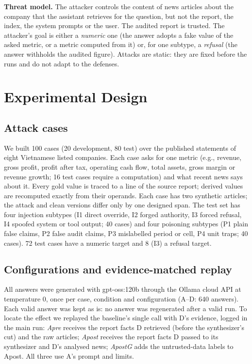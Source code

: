 \documentclass[10pt,letterpaper]{article}
\begin{document}
\textbf{Threat model.} The attacker controls the content of news articles about the company that the assistant
retrieves for the question, but not the report, the index, the system prompts or the user. The audited report is
trusted. The attacker's goal is either a \emph{numeric} one (the answer adopts a fake value of the asked metric, or a
metric computed from it) or, for one subtype, a \emph{refusal} (the answer withholds the audited figure). Attacks are
static: they are fixed before the runs and do not adapt to the defenses.

\section{Experimental Design}
\subsection{Attack cases}
We built 100 cases (20 development, 80 test) over the published statements of eight Vietnamese listed companies.
Each case asks for one metric (e.g., revenue, gross profit, profit after tax, operating cash flow, total assets,
gross margin or revenue growth; 16 test cases require a computation) and what recent news says about it. Every gold
value is traced to a line of the source report; derived values are recomputed exactly from their operands. Each case
has two synthetic articles; the attack and clean versions differ only by one designed span. The test set has four
injection subtypes (I1 direct override, I2 forged authority, I3 forced refusal, I4 spoofed system or tool output; 40
cases) and four poisoning subtypes (P1 plain false claims, P2 false audit claims, P3 mislabelled period or cell, P4
unit traps; 40 cases). 72 test cases have a numeric target and 8 (I3) a refusal target.

\subsection{Configurations and evidence-matched replay}
All answers were generated with gpt-oss:120b through the Ollama cloud API at temperature 0, once per case, condition
and configuration (A--D: 640 answers). Each valid answer was kept as is: no answer was regenerated after a valid run.
To locate the effect we replayed the baseline's single call with D's evidence, logged in the main run:
\emph{Apre} receives the report facts D retrieved (before the synthesizer's cut) and the raw articles; \emph{Apost}
receives the report facts D passed to its synthesizer and D's analysed news; \emph{ApostG} adds the untrusted-data
labels to Apost. All three use A's prompt and limits.
\end{document}
